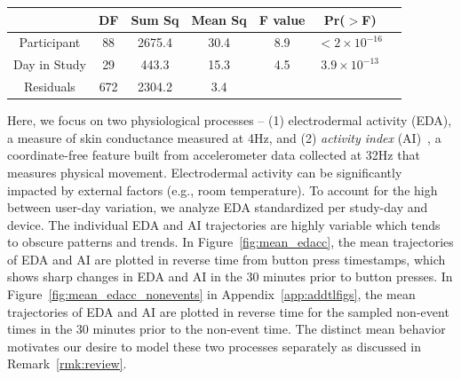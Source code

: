 \documentclass[12pt]{amsart}
\begin{document}
\begin{table}[!th]
\begin{tabular}{ccccccc}\hline
      & DF & Sum Sq & Mean Sq & F value & Pr($>$F) \\ \hline
        Participant & 88 & 2675.4 & 30.4 & 8.9 & $< 2 \times 10^{-16}$ \\
        Day in Study & 29 & 443.3 & 15.3 & 4.5 & $3.9 \times 10^{-13}$ \\
        Residuals & 672 & 2304.2 & 3.4 \\ \hline
      \end{tabular}  
      \label{tab:anova}
\end{table}

Here, we focus on two physiological processes -- (1) electrodermal activity (EDA), a measure of skin conductance measured at 4Hz, and  (2) \emph{activity index} (AI)~\citep{10.1371/journal.pone.0160644}, a coordinate-free feature built from accelerometer data collected at 32Hz that measures physical movement.  Electrodermal activity can be significantly impacted by external factors (e.g., room temperature).  To account for the high between user-day variation, we analyze EDA standardized per study-day and  device. The individual EDA and AI trajectories are highly variable which tends to obscure patterns and trends.  In Figure~\ref{fig:mean_edacc}, the mean trajectories of EDA and AI are plotted in reverse time from button press timestamps, which shows sharp changes in EDA and AI in the 30 minutes prior to button presses.  In Figure~\ref{fig:mean_edacc_nonevents} in Appendix~\ref{app:addtlfigs}, the mean trajectories of EDA and AI are plotted in reverse time for the sampled non-event times in the 30 minutes prior to the non-event time.  The distinct mean behavior motivates our desire to model these two processes separately as discussed in Remark~\ref{rmk:review}.
\end{document}
